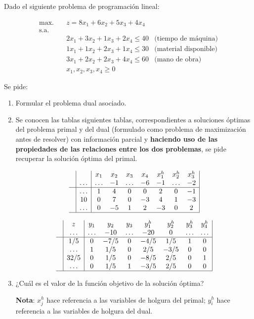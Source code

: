Dado el siguiente problema de programación lineal:

\[
\begin{aligned}
\mbox{max.} \quad & z = 8x_1 + 6x_2 + 5x_3  + 4x_4 \\
\text{s.a.} \quad & \\
& 2x_1 + 3x_2 + 1x_3 + 2x_4 \le 40 & \text{(tiempo de máquina)} \\
& 1x_1 + 1x_2 + 2x_3 + 1x_4 \le 30 & \text{(material disponible)} \\
& 3x_1 + 2x_2 + 2x_3 + 4x_4 \le 60 & \text{(mano de obra)} \\
& x_1, x_2, x_3, x_4 \ge 0 &
\end{aligned}
\]

Se pide:
\begin{enumerate}[label=\alph*)]
    \item Formular el problema dual asociado.

    \item Se conocen las tablas siguientes tablas, correspondientes a soluciones óptimas del problema primal y del dual (formulado como problema de maximización antes de resolver) con información parcial y \textbf{haciendo uso de las propiedades de las relaciones entre los dos problemas}, se pide recuperar la solución óptima del primal.

        \[
    \begin{array}{c|c|ccccccc|}
          &        & x_1    & x_2 & x_3    & x_4 & x^h_1 & x^h_2  & x^h_3\\ 
          & \ldots & \ldots & -1  & \ldots & -6  & -1    & \ldots & -2 \\ 
    \hline
          & \ldots & 1      & 4   & 0      & 0   & 2     & 0      & -1\\ 
          & 10     & 0      & 7   & 0      & -3  & 4     & 1      & -3\\ 
          & \ldots & 0      & -5  & 1      & 2   & -3    & 0      & 2\\ 
    \hline
    \end{array}
    \]
    
    \[
    \begin{array}{c|c|ccccccc|}
           & z      & y_1    & y_2 & y_3    & y^h_1 & y^h_2 & y^h_3  & y^h_4\\ 
           & \ldots & \ldots & -10 & \ldots & -20   & 0     & \ldots & \ldots \\ 
    \hline
           & 1/5       & 0   & -7/5   & 0      & -4/5  & 1/5   & 1      & 0\\ 
           & \ldots    & 1   & 1/5    & 0      & 2/5   & -3/5  & 0      & 0\\ 
           & 32/5      & 0   & 1/5    & 0      & -8/5  & 2/5   & 0      & 1\\ 
        & \ldots    & 0   & 1/5    & 1      & -3/5  & 2/5   & 0      & 0\\ 
    \hline
    \end{array}
    \]
    
    
    \item ¿Cuál es el valor de la función objetivo de la solución óptima?

    \textbf{Nota}: $x^h_j$ hace referencia a las variables de holgura del primal;  $y^h_i$ hace referencia a las variables de holgura del dual.
\end{enumerate}